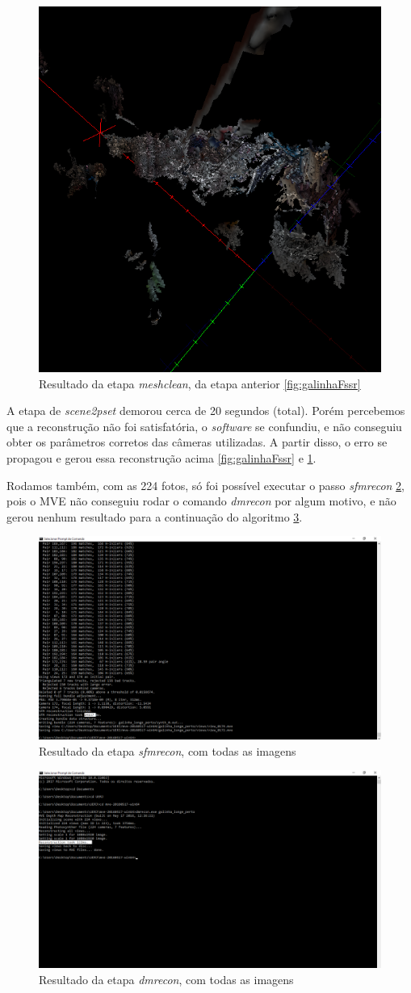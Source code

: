 \begin{figure}[!h]
	\centering
	\includegraphics[width=0.5\linewidth]{figs/galinhameshclean.png}
	\caption{%
	Resultado da etapa \emph{meshclean}, da etapa anterior \ref{fig:galinhaFssr}
	}\label{fig:galinhaMeshClean}
\end{figure}

\newpage

A etapa de \emph{scene2pset} demorou cerca de 20 segundos (total). Porém percebemos que a reconstrução não foi satisfatória, o \emph{software} se confundiu, e não conseguiu obter os parâmetros corretos das câmeras utilizadas. A partir disso, o erro se propagou e gerou essa reconstrução acima \ref{fig:galinhaFssr} e \ref{fig:galinhaMeshClean}.

Rodamos também, com as 224 fotos, só foi possível executar o passo \emph{sfmrecon} \ref{fig:galinhaSfM224}, pois o MVE não conseguiu rodar o comando \emph{dmrecon} por algum motivo, e não gerou nenhum resultado para a continuação do algoritmo \ref{fig:galinhaDMR224}.

\begin{figure}[!h]
	\centering
	\includegraphics[width=0.5\linewidth]{figs/mvesfmrecongalinhapertolonge.png}
	\caption{%
	Resultado da etapa \emph{sfmrecon}, com todas as imagens
	}\label{fig:galinhaSfM224}
\end{figure}

\begin{figure}[!h]
	\centering
	\includegraphics[width=0.5\linewidth]{figs/mvedmrecongalinhapertolonge.png}
	\caption{%
	Resultado da etapa \emph{dmrecon}, com todas as imagens
	}\label{fig:galinhaDMR224}
\end{figure}

